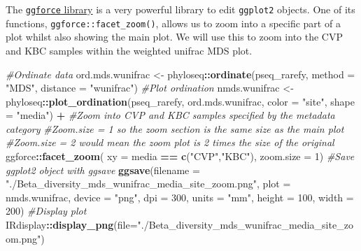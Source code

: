 \documentclass[
]{book}
\newenvironment{Shaded}{\begin{snugshade}}{\end{snugshade}}
\newcommand{\AttributeTok}[1]{\textcolor[rgb]{0.13,0.29,0.53}{#1}}
\newcommand{\CommentTok}[1]{\textcolor[rgb]{0.56,0.35,0.01}{\textit{#1}}}
\newcommand{\DecValTok}[1]{\textcolor[rgb]{0.00,0.00,0.81}{#1}}
\newcommand{\FunctionTok}[1]{\textcolor[rgb]{0.13,0.29,0.53}{\textbf{#1}}}
\newcommand{\NormalTok}[1]{#1}
\newcommand{\OtherTok}[1]{\textcolor[rgb]{0.56,0.35,0.01}{#1}}
\newcommand{\SpecialCharTok}[1]{\textcolor[rgb]{0.81,0.36,0.00}{\textbf{#1}}}
\newcommand{\StringTok}[1]{\textcolor[rgb]{0.31,0.60,0.02}{#1}}
\begin{document}
The \href{https://ggforce.data-imaginist.com/index.html}{\texttt{ggforce} library} is a very powerful library to edit \texttt{ggplot2} objects.
One of its functions, \texttt{ggforce::facet\_zoom()}, allows us to zoom into a specific part of a plot whilst also showing the main plot.
We will use this to zoom into the CVP and KBC samples within the weighted unifrac MDS plot.

\begin{Shaded}
\begin{Highlighting}[]
\CommentTok{\#Ordinate data}
\NormalTok{ord.mds.wunifrac }\OtherTok{\textless{}{-}}\NormalTok{ phyloseq}\SpecialCharTok{::}\FunctionTok{ordinate}\NormalTok{(pseq\_rarefy, }\AttributeTok{method =} \StringTok{"MDS"}\NormalTok{, }\AttributeTok{distance =} \StringTok{"wunifrac"}\NormalTok{)}
\CommentTok{\#Plot ordination}
\NormalTok{nmds.wunifrac }\OtherTok{\textless{}{-}}\NormalTok{ phyloseq}\SpecialCharTok{::}\FunctionTok{plot\_ordination}\NormalTok{(pseq\_rarefy, ord.mds.wunifrac,}
                                   \AttributeTok{color =} \StringTok{"site"}\NormalTok{, }\AttributeTok{shape =} \StringTok{"media"}\NormalTok{) }\SpecialCharTok{+}
                  \CommentTok{\#Zoom into CVP and KBC samples specified by the metadata category}
                  \CommentTok{\#Zoom.size = 1 so the zoom section is the same size as the main plot}
                  \CommentTok{\#Zoom.size = 2 would mean the zoom plot is 2 times the size of the original}
\NormalTok{                  ggforce}\SpecialCharTok{::}\FunctionTok{facet\_zoom}\NormalTok{( }\AttributeTok{xy =}\NormalTok{ media }\SpecialCharTok{==} \FunctionTok{c}\NormalTok{(}\StringTok{"CVP"}\NormalTok{,}\StringTok{"KBC"}\NormalTok{), }\AttributeTok{zoom.size =} \DecValTok{1}\NormalTok{)}
\CommentTok{\#Save ggplot2 object with ggsave}
\FunctionTok{ggsave}\NormalTok{(}\AttributeTok{filename =} \StringTok{"./Beta\_diversity\_mds\_wunifrac\_media\_site\_zoom.png"}\NormalTok{, }\AttributeTok{plot =}\NormalTok{ nmds.wunifrac,}
       \AttributeTok{device =} \StringTok{"png"}\NormalTok{, }\AttributeTok{dpi =} \DecValTok{300}\NormalTok{, }\AttributeTok{units =} \StringTok{"mm"}\NormalTok{, }\AttributeTok{height =} \DecValTok{100}\NormalTok{, }\AttributeTok{width =} \DecValTok{200}\NormalTok{)}
\CommentTok{\#Display plot}
\NormalTok{IRdisplay}\SpecialCharTok{::}\FunctionTok{display\_png}\NormalTok{(}\AttributeTok{file=}\StringTok{"./Beta\_diversity\_mds\_wunifrac\_media\_site\_zoom.png"}\NormalTok{)}
\end{Highlighting}
\end{Shaded}
\end{document}
